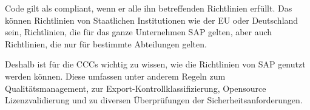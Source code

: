 \documentclass[../main.tex]{subfiles}
\begin{document}

Code gilt als compliant, wenn er alle ihn betreffenden Richtlinien erfüllt.
Das können Richtlinien von Staatlichen Institutionen wie der \acrshort{EU} oder Deutschland sein, Richtlinien, die für das ganze Unternehmen SAP gelten, aber auch Richtlinien, die nur für bestimmte Abteilungen gelten.

Deshalb ist für die \glspl{CCC} wichtig zu wissen, wie die Richtlinien von SAP genutzt werden können.
Diese umfassen unter anderem Regeln zum Qualitätsmanagement, zur Export-Kontrollklassifizierung, Opensource Lizenzvalidierung und zu diversen Überprüfungen der Sicherheitsanforderungen.
\end{document}

